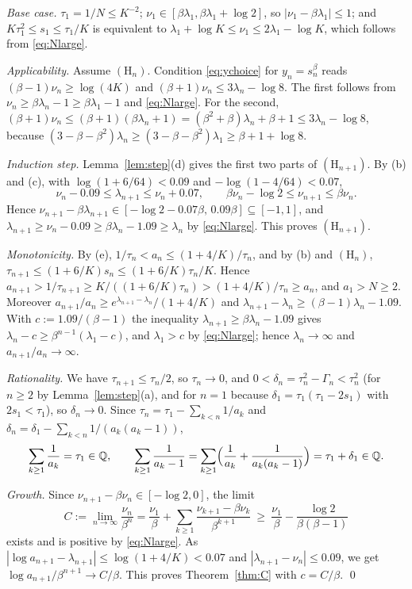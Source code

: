 \documentclass[11pt]{amsart}
\theoremstyle{definition}
\theoremstyle{remark}
\newcommand{\Q}{\mathbb{Q}}
\begin{document}
\emph{Base case.} $\tau_1=1/N\le K^{-2}$; $\nu_1\in[\beta\lambda_1,\beta\lambda_1+\log2]$,
so $|\nu_1-\beta\lambda_1|\le1$; and $K\tau_1^2\le s_1\le\tau_1/K$ is equivalent to
$\lambda_1+\log K\le\nu_1\le2\lambda_1-\log K$, which follows from \eqref{eq:Nlarge}.

\emph{Applicability.} Assume $(\mathrm H_n)$. Condition \eqref{eq:ychoice} for
$y_n=s_n^\beta$ reads $(\beta-1)\nu_n\ge\log(4K)$ and $(\beta+1)\nu_n\le3\lambda_n-\log8$.
The first follows from $\nu_n\ge\beta\lambda_n-1\ge\beta\lambda_1-1$ and
\eqref{eq:Nlarge}. For the second,
$(\beta+1)\nu_n\le(\beta+1)(\beta\lambda_n+1)=(\beta^2+\beta)\lambda_n+\beta+1\le3\lambda_n-\log8$,
because $(3-\beta-\beta^2)\lambda_n\ge(3-\beta-\beta^2)\lambda_1\ge\beta+1+\log8$.

\emph{Induction step.} Lemma~\ref{lem:step}(d) gives the first two parts of
$(\mathrm H_{n+1})$. By (b) and (c), with $\log(1+6/64)<0.09$ and $-\log(1-4/64)<0.07$,
\[
\nu_n-0.09\le\lambda_{n+1}\le\nu_n+0.07,\qquad \beta\nu_n-\log2\le\nu_{n+1}\le\beta\nu_n .
\]
Hence $\nu_{n+1}-\beta\lambda_{n+1}\in[-\log2-0.07\beta,\,0.09\beta]\subseteq[-1,1]$, and
$\lambda_{n+1}\ge\nu_n-0.09\ge\beta\lambda_n-1.09\ge\lambda_n$ by \eqref{eq:Nlarge}.
This proves $(\mathrm H_{n+1})$.

\emph{Monotonicity.} By (e), $1/\tau_n<a_n\le(1+4/K)/\tau_n$, and by (b) and
$(\mathrm H_n)$, $\tau_{n+1}\le(1+6/K)s_n\le(1+6/K)\tau_n/K$. Hence
$a_{n+1}>1/\tau_{n+1}\ge K/((1+6/K)\tau_n)>(1+4/K)/\tau_n\ge a_n$, and $a_1>N\ge2$.
Moreover $a_{n+1}/a_n\ge e^{\lambda_{n+1}-\lambda_n}/(1+4/K)$ and
$\lambda_{n+1}-\lambda_n\ge(\beta-1)\lambda_n-1.09$. With $c:=1.09/(\beta-1)$ the
inequality $\lambda_{n+1}\ge\beta\lambda_n-1.09$ gives
$\lambda_n-c\ge\beta^{n-1}(\lambda_1-c)$, and $\lambda_1>c$ by \eqref{eq:Nlarge}; hence
$\lambda_n\to\infty$ and $a_{n+1}/a_n\to\infty$.

\emph{Rationality.} We have $\tau_{n+1}\le\tau_n/2$, so $\tau_n\to0$, and
$0<\delta_n=\tau_n^2-\Gamma_n<\tau_n^2$ (for $n\ge2$ by Lemma~\ref{lem:step}(a), and for
$n=1$ because $\delta_1=\tau_1(\tau_1-2s_1)$ with $2s_1<\tau_1$), so $\delta_n\to0$.
Since $\tau_n=\tau_1-\sum_{k<n}1/a_k$ and $\delta_n=\delta_1-\sum_{k<n}1/(a_k(a_k-1))$,
\[
\sum_{k\ge1}\frac1{a_k}=\tau_1\in\Q,\qquad
\sum_{k\ge1}\frac1{a_k-1}=\sum_{k\ge1}\Bigl(\frac1{a_k}+\frac1{a_k(a_k-1)}\Bigr)=\tau_1+\delta_1\in\Q .
\]

\emph{Growth.} Since $\nu_{n+1}-\beta\nu_n\in[-\log2,0]$, the limit
\[
C:=\lim_{n\to\infty}\frac{\nu_n}{\beta^n}=\frac{\nu_1}{\beta}+\sum_{k\ge1}\frac{\nu_{k+1}-\beta\nu_k}{\beta^{k+1}}
\ \ge\ \frac{\nu_1}{\beta}-\frac{\log2}{\beta(\beta-1)}
\]
exists and is positive by \eqref{eq:Nlarge}. As
$|\log a_{n+1}-\lambda_{n+1}|\le\log(1+4/K)<0.07$ and $|\lambda_{n+1}-\nu_n|\le0.09$, we
get $\log a_{n+1}/\beta^{n+1}\to C/\beta$. This proves Theorem~\ref{thm:C} with
$c=C/\beta$. \qed
\end{document}
